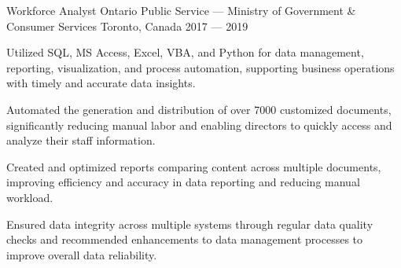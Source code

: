 \begin{cventries}
\cventry%
	{Workforce Analyst}
	{Ontario Public Service --- Ministry of Government \& Consumer Services}
	{Toronto, Canada}
	{2017 --- 2019}
	{
		\begin{cvitems}
			\item Utilized SQL, MS Access, Excel, VBA, and Python for data management, reporting, visualization, and process automation, supporting business operations with timely and accurate data insights.
			\item Automated the generation and distribution of over 7000 customized documents, significantly reducing manual labor and enabling directors to quickly access and analyze their staff information.
			\item Created and optimized reports comparing content across multiple documents, improving efficiency and accuracy in data reporting and reducing manual workload.
			\item Ensured data integrity across multiple systems through regular data quality checks and recommended enhancements to data management processes to improve overall data reliability.
		\end{cvitems}
	}

\end{cventries}
